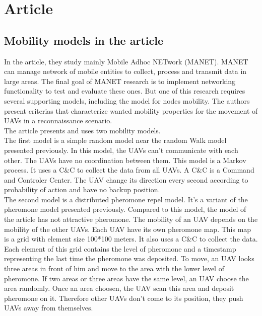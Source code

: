 \part{Article}

\setcounter{chapter}{0}

\chapter{Mobility models in the article}

In the article, they study mainly Mobile Adhoc NETwork (MANET). MANET can manage network of mobile entities to collect, process and transmit data in large areas. The final goal of MANET research is to implement networking functionality to test and evaluate these ones. But one of this research requires several supporting models, including the model for nodes mobility. The authors present criterias that characterize wanted mobility properties for the movement of UAVs in a reconnaissance scenario.\\

\noindent The article presents and uses two mobility models.\\

The first model is a simple random model near the random Walk model presented previously. In this model, the UAVs can't communicate with each other. The UAVs have no coordination between them. This model is a Markov process. It uses a C\&C to collect the data from all UAVs. A C\&C is a Command and Controler Center.  The UAV change its direction every second according to probability of action and have no backup position.\\

The second model is a distributed pheromone repel model. It's a variant of the pheromone model presented previously. Compared to this model, the model of the article has not attractive pheromone. The mobility of an UAV depends on the mobility of the other UAVs. Each UAV have its own pheromone map. This map is a grid with element size 100*100 meters. It also uses a C\&C to collect the data. Each element of this grid contains the level of pheromone and a timestamp representing the last time the pheromone was deposited. To move, an UAV looks three areas in front of him and move to the area with the lower level of pheromone. If two areas or three areas have the same level, an UAV choose the area randomly. Once an area choosen, the UAV scan this area and deposit pheromone on it. Therefore other UAVs don't come to its position, they push UAVs away from themselves.

